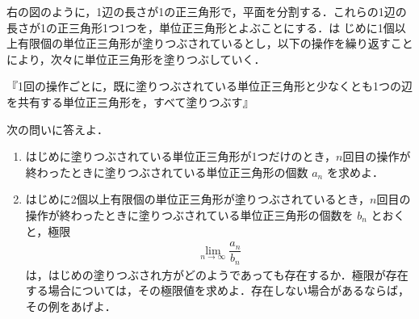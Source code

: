 \documentclass[../../main.tex]{subfiles}
\begin{document}
右の図のように，1辺の長さが1の正三角形で，平面を分割する．これらの1辺の長さが1の正三角形1つ1つを，単位正三角形とよぶことにする．は
じめに1個以上有限個の単位正三角形が塗りつぶされているとし，以下の操作を繰り返すことにより，次々に単位正三角形を塗りつぶしていく．

『1回の操作ごとに，既に塗りつぶされている単位正三角形と少なくとも1つの辺を共有する単位正三角形を，すべて塗りつぶす』

次の問いに答えよ．

\begin{enumerate}
  \item はじめに塗りつぶされている単位正三角形が1つだけのとき，$n$回目の操作が終わったときに塗りつぶされている単位正三角形の個数 $a_n$ を求めよ．
  \item はじめに2個以上有限個の単位正三角形が塗りつぶされているとき，$n$回目の操作が終わったときに塗りつぶされている単位正三角形の個数を $b_n$ とおくと，極限
    \begin{align}
      \lim_{n \to \infty} \dfrac{a_n}{b_n}
    \end{align}
    は，はじめの塗りつぶされ方がどのようであっても存在するか．極限が存在する場合については，その極限値を求めよ．存在しない場合があるならば，その例をあげよ．
\end{enumerate}

\begin{figure}[H]
  \centering
\end{figure}
\end{document}
